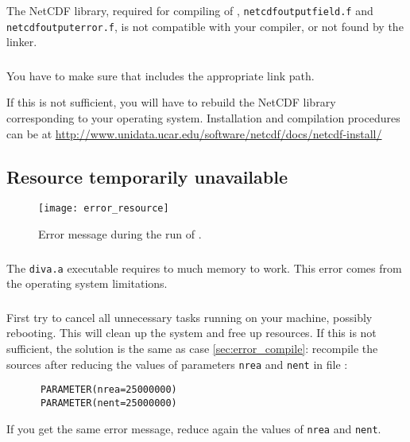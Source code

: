 The NetCDF library, required for compiling of , \texttt{netcdf\-output\-field.f} and \texttt{netcdf\-output\-error.f}, is not compatible with your compiler, or not found by the linker.

\subsubsection{\answer}

You have to make sure that  includes the appropriate link path.

If this is not sufficient, you will have to rebuild the NetCDF library corresponding to your operating system. Installation and compilation procedures can be at \url{http://www.unidata.ucar.edu/software/netcdf/docs/netcdf-install/}



\subsection[Resource temporarily unavailable]{Resource temporarily unavailable \label{sec:error_resource}}


\begin{figure}[htpb]
\centering
\texttt{[image: error\_resource]}
\caption{Error message during the run of \label{fig:error_resource}.}
\end{figure}

\subsubsection{\question}

The \texttt{diva.a} executable requires to much memory to work. This error comes from the operating system limitations.


\subsubsection{\answer}
First try to cancel all unnecessary tasks running on your machine, possibly rebooting. This will clean up the system and free up resources. If this is not sufficient, the solution is the same as case \ref{sec:error_compile}: recompile the sources after reducing the values of parameters \texttt{nrea} and \texttt{nent} in file :
\begin{verbatim}
      PARAMETER(nrea=25000000)
      PARAMETER(nent=25000000)
\end{verbatim}
If you get the same error message, reduce again the values of \texttt{nrea} and \texttt{nent}.

